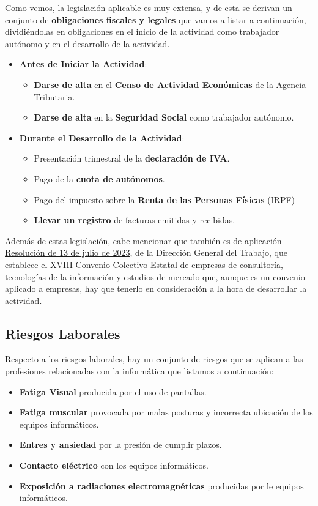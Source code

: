 Como vemos, la legislación aplicable es muy extensa, y de esta se derivan un conjunto de \textbf{obligaciones fiscales y legales} que vamos a listar a continuación, dividiéndolas en obligaciones en el inicio de la actividad como trabajador autónomo y en el desarrollo de la actividad.

\begin{itemize}
	\item \textbf{Antes de Iniciar la Actividad}:
	\begin{itemize}
		\item \textbf{Darse de alta} en el \textbf{Censo de Actividad Económicas} de la Agencia Tributaria.
		\item \textbf{Darse de alta} en la \textbf{Seguridad Social} como trabajador autónomo.

	\end{itemize}
	\item \textbf{Durante el Desarrollo de la Actividad}:
		\begin{itemize}
		\item Presentación trimestral de  la \textbf{declaración de IVA}.
		\item Pago de la \textbf{cuota de autónomos}.
		\item Pago del impuesto sobre la \textbf{Renta de las Personas Físicas} (IRPF)	
	    \item \textbf{Llevar un registro} de facturas emitidas y recibidas.
	\end{itemize}
\end{itemize}

Además de estas legislación, cabe mencionar que también es de aplicación \href{https://www.boe.es/diario_boe/txt.php?id=BOE-A-2023-17238}{Resolución de 13 de julio de 2023}, de la Dirección General del Trabajo, que establece el XVIII Convenio Colectivo Estatal de empresas de consultoría, tecnologías de la información y estudios de mercado que, aunque es un convenio aplicado a empresas, hay que tenerlo en consideración a la hora de desarrollar la actividad.

\subsection{Riesgos Laborales}
Respecto a los riesgos laborales, hay un conjunto de riesgos que se aplican a las profesiones relacionadas con la informática que listamos a continuación:

\begin{itemize}
	\item \textbf{Fatiga Visual} producida por el uso de pantallas.
	\item \textbf{Fatiga muscular} provocada por malas posturas y incorrecta ubicación de los equipos informáticos.
	\item \textbf{Entres y ansiedad} por la presión de cumplir plazos.
	\item \textbf{Contacto eléctrico} con los equipos informáticos.
	\item \textbf{Exposición a radiaciones electromagnéticas} producidas por le equipos informáticos.
\end{itemize} 

